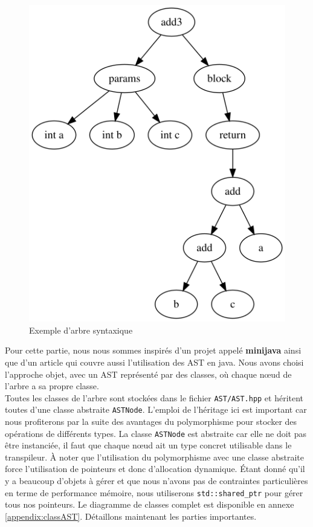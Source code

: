 \documentclass[a4paper]{article}%
\begin{document}
\begin{figure}[h]
  \begin{center}
  \includegraphics[scale=0.4]{img/ast1.png}
  \caption{Exemple d'arbre syntaxique}
  \end{center}
\end{figure}

Pour cette partie, nous nous sommes inspirés d'un projet appelé \textbf{minijava}
\cite{minijava} ainsi que d'un article \cite{gagnon1998sablecc} qui couvre aussi
l'utilisation des AST en java. Nous avons choisi l'approche objet, avec un AST
représenté par des classes, où chaque nœud de l'arbre a sa propre classe.\\

Toutes les classes de l'arbre sont stockées dans le fichier
\lstinline{AST/AST.hpp} et héritent toutes d'une classe abstraite
\lstinline{ASTNode}. L'emploi de l'héritage ici est important car
nous profiterons par la suite des avantages du polymorphisme pour stocker des
opérations de différents types. La classe \lstinline{ASTNode} est abstraite car
elle ne doit pas être instanciée, il faut que chaque nœud ait un type concret
utilisable dans le transpileur. À noter que l'utilisation du polymorphisme
avec une classe abstraite force l'utilisation de pointeurs et donc d'allocation
dynamique. Étant donné qu'il y a beaucoup d'objets à gérer et que nous n'avons
pas de contraintes particulières en terme de performance mémoire, nous utiliserons
\lstinline{std::shared_ptr} pour gérer tous nos pointeurs. Le diagramme de
classes complet est disponible en annexe \ref{appendix:classAST}. Détaillons
maintenant les parties importantes.
\end{document}
